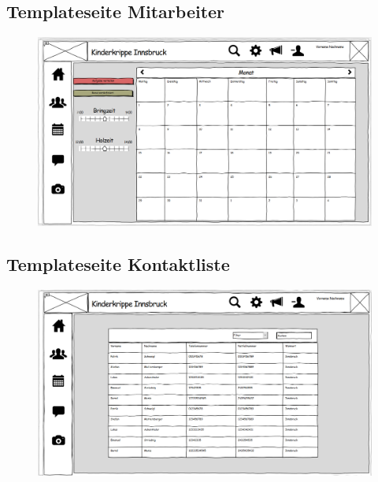   \subsection{Templateseite Mitarbeiter}
 \begin{figure}[ht!]
  \includegraphics[width = 150mm]{pictures/Grundstellung_Mitarbeiter.PNG}
 \end{figure}
 
  \newpage
 \subsection{Templateseite Kontaktliste}
 \begin{figure}[ht!]
  \includegraphics[width = 150mm]{pictures/Kontaktliste.PNG}
 \end{figure}
 
